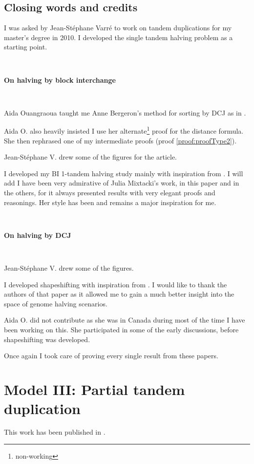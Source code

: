 \documentclass[11pt,final,twoside,nofrench]{thlifl}
\begin{document}
\subsection{Closing words and credits}

I was asked by Jean-Stéphane Varré to work on tandem duplications for my master's degree in 2010. I developed the single tandem halving problem as a starting point.

~~

\textbf{On halving by block interchange}

~~

Aida Ouangraoua taught me Anne Bergeron's method for sorting by DCJ as in \cite{BMS06}.

Aida O. also heavily insisted I use her alternate\footnote{non-working} proof for the distance formula. She then rephrased one of my intermediate proofs (proof \ref{proof:proofType2}).

Jean-Stéphane V. drew some of the figures for the article.

I developed my BI 1-tandem halving study mainly with inspiration from \cite{Mixtacki08}. I will add I have been very admirative of Julia Mixtacki's work, in this paper and in the others, for it always presented results with very elegant proofs and reasonings. Her style has been and remains a major inspiration for me.

~

\textbf{On halving by DCJ}

~~

Jean-Stéphane V. drew some of the figures.

I developed shapeshifting with inspiration from \cite{Kovac}. I would like to thank the authors of that paper as it allowed me to gain a much better insight into the space of genome halving scenarios.

Aida O. did not contribute as she was in Canada during most of the time I have been working on this. She participated in some of the early discussions, before shapeshifting was developed.

Once again I took care of proving every single result from these papers.

\section{Model III: Partial tandem duplication}
\label{sec:partialdup}

This work has been published in \cite{Thomas12}. 
\end{document}
